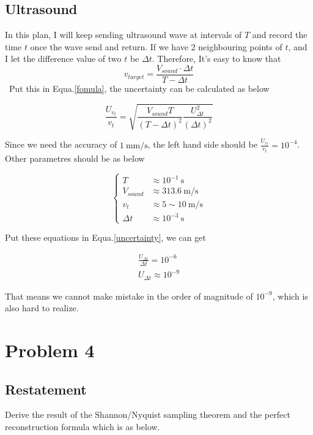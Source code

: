 \documentclass{article}
\begin{document}
\subsection{Ultrasound}
In this plan, I will keep sending ultrasound wave at intervals of $T$ and record the time $t$ once the wave send and return. If we have 2 neighbouring points of $t$, and I let the difference value of two $t$ be $\Delta t$. Therefore, It's easy to know that
\begin{equation}
    v_{target} = \frac{V_{sound}  \cdot \Delta t}{T - \Delta t}
\end{equation}
\
Put this in Equa.\ref{fomula}, the uncertainty can be calculated as below

\begin{equation}
    \label{uncertainty}
    \frac{U_{v_t}}{v_t} = \sqrt{\frac{V_{sound}T}{(T-\Delta t)^2} \frac{U_{\Delta t}^2}{(\Delta t)^2}}
\end{equation}

Since we need the accuracy of $1~\mathrm{mm/s}$, the left hand side should be $\frac{U_{v_t}}{v_t} = 10^{-4}$. Other parametres should be as below

\begin{equation*}
    \left\{
    \begin{array}{ll}
        T         & \approx 10^{-1} ~ \mathrm{s}     \\
        V_{sound} & \approx 313.6 ~ \mathrm{m/s}     \\
        v_t       & \approx 5 \sim 10 ~ \mathrm{m/s} \\
        \Delta t  & \approx 10^{-3} ~ \mathrm{s}
    \end{array}
    \right.
\end{equation*}

Put these equations in Equa.\ref{uncertainty}, we can get

\begin{gather}
    \frac{U_{\Delta t}}{\Delta t} = 10^{-6}\\
    U_{\Delta t} \approx 10^{-9}
\end{gather}

That means we cannot make mistake in the order of magnitude of $10^{-9}$, which is also hard to realize.


\section{Problem 4}
\subsection{Restatement}
Derive the result of the Shannon/Nyquist sampling theorem and the perfect reconstruction formula which is as below.
\end{document}
